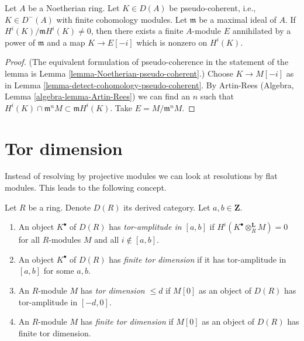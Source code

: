 \begin{lemma}
\label{lemma-detect-cohomology}
Let $A$ be a Noetherian ring. Let $K \in D(A)$ be pseudo-coherent,
i.e., $K \in D^-(A)$ with finite cohomology modules.
Let $\mathfrak m$ be a maximal ideal of $A$.
If $H^i(K)/\mathfrak m H^i(K) \not = 0$, then there exists a finite
$A$-module $E$ annihilated by a power of $\mathfrak m$
and a map $K \to E[-i]$ which is nonzero on $H^i(K)$.
\end{lemma}

\begin{proof}
(The equivalent formulation of pseudo-coherence in the statement of the
lemma is Lemma \ref{lemma-Noetherian-pseudo-coherent}.)
Choose $K \to M[-i]$ as in Lemma \ref{lemma-detect-cohomology-pseudo-coherent}.
By Artin-Rees (Algebra, Lemma \ref{algebra-lemma-Artin-Rees})
we can find an $n$ such that
$H^i(K) \cap \mathfrak m^n M \subset \mathfrak m H^i(K)$.
Take $E = M/\mathfrak m^n M$.
\end{proof}









\section{Tor dimension}
\label{section-tor}

\noindent
Instead of resolving by projective modules we can look
at resolutions by flat modules. This leads to the following
concept.

\begin{definition}
\label{definition-tor-amplitude}
Let $R$ be a ring. Denote $D(R)$ its derived category.
Let $a, b \in \mathbf{Z}$.
\begin{enumerate}
\item An object $K^\bullet$ of $D(R)$ has
{\it tor-amplitude in $[a, b]$}
if $H^i(K^\bullet \otimes_R^\mathbf{L} M) = 0$ for all $R$-modules
$M$ and all $i \not \in [a, b]$.
\item An object $K^\bullet$ of $D(R)$ has {\it finite tor dimension}
if it has tor-amplitude in $[a, b]$ for some $a, b$.
\item An $R$-module $M$ has {\it tor dimension $\leq d$}
if $M[0]$ as an object of $D(R)$ has tor-amplitude in $[-d, 0]$.
\item An $R$-module $M$ has {\it finite tor dimension}
if $M[0]$ as an object of $D(R)$ has finite tor dimension.
\end{enumerate}
\end{definition}

